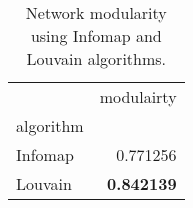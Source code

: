 \begin{table}[!htbp]
\centering
\caption{Network modularity using Infomap and Louvain algorithms.}
\label{tab:modularity}
\begin{tabular}{lr}
\toprule
 & modulairty \\
algorithm &  \\
\midrule
Infomap & 0.771256 \\
Louvain & \textbf{0.842139} \\
\bottomrule
\end{tabular}
\end{table}
